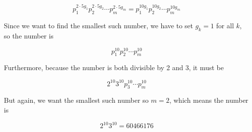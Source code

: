 \documentclass{article}
\theoremstyle{definition}
\begin{document}
  \begin{equation*}
    p_1^{2\cdot5g_1}p_2^{2\cdot5g_2} \cdots p_m^{2\cdot5g_m} = p_1^{10g_1}p_2^{10g_2} \cdots p_m^{10g_m}
  \end{equation*}
  
  Since we want to find the smallest such number, we have to set $g_k = 1$ for all $k$, so the number is
  
  \begin{equation*}
    p_1^{10} p_2^{10} \cdots p_m^{10}
  \end{equation*}
  
  Furthermore, because the number is both divisible by 2 and 3, it must be
  
  \begin{equation*}
    2^{10} 3^{10} p_3^{10} \cdots p_m^{10}
  \end{equation*}
  
  But again, we want the smallest such number so $m = 2$, which means the number is
  
  \begin{equation*}
    2^{10} 3^{10} = 60466176
  \end{equation*}
\end{document}
